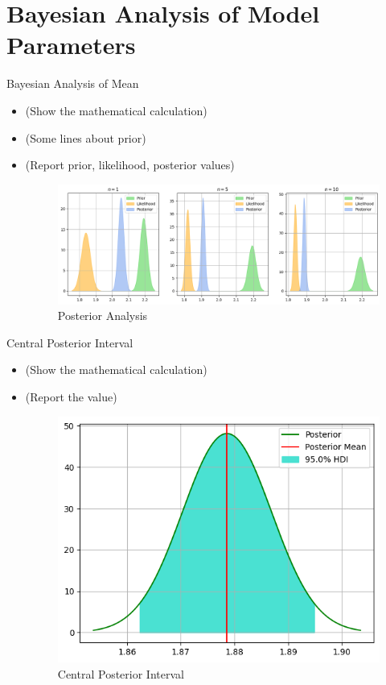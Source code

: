 \section{Bayesian Analysis of Model Parameters}

\begin{frame}{Bayesian Analysis of Mean}
\begin{itemize}
        \item (Show the mathematical calculation)
        \item (Some lines about prior)
        \item (Report prior, likelihood, posterior values)
        \begin{figure}
        \centering
        \includegraphics[width=0.8\linewidth]{Project1/Report/images/posterior.png}
        \caption{Posterior Analysis}
        \label{fig:enter-label}
    \end{figure}
\end{itemize}
  
\end{frame}

\begin{frame}{Central Posterior Interval}
\begin{itemize}
        \item (Show the mathematical calculation)
        \item (Report the value)
        \begin{figure}
        \centering
        \includegraphics[width=0.8\linewidth]{Project1/Report/images/hdi.png}
        \caption{Central Posterior Interval}
        \label{fig:enter-label}
    \end{figure}
\end{itemize}
  
\end{frame}

